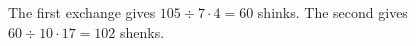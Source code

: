 The first exchange gives $105\div7\cdot4=60$ shinks. The second gives $60\div10\cdot17=\boxed{102}$ shenks.
